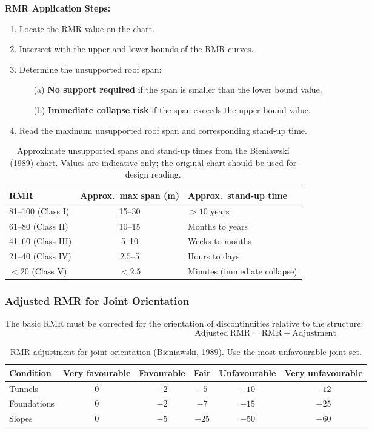\documentclass[a4paper,12pt]{article}
\begin{document}
\textbf{RMR Application Steps:}
\begin{enumerate}
    \item Locate the RMR value on the chart.
    \item Intersect with the upper and lower bounds of the RMR curves.
    \item Determine the unsupported roof span:
    \begin{itemize}
        \item[(a)] \textbf{No support required} if the span is smaller than the lower bound value.
        \item[(b)] \textbf{Immediate collapse risk} if the span exceeds the upper bound value.
    \end{itemize}
    \item Read the maximum unsupported roof span and corresponding stand-up time.
\end{enumerate}

\begin{table}[ht]
\centering
\begin{tabularx}{\textwidth}{l c X}
\toprule
\textbf{RMR} & \textbf{Approx.\ max span (m)} & \textbf{Approx.\ stand-up time} \\
\midrule
81--100 (Class I) & 15--30 & $>10$ years \\
61--80 (Class II) & 10--15 & Months to years \\
41--60 (Class III) & 5--10 & Weeks to months \\
21--40 (Class IV) & 2.5--5 & Hours to days \\
$<20$ (Class V) & $<2.5$ & Minutes (immediate collapse) \\
\bottomrule
\end{tabularx}
\caption{Approximate unsupported spans and stand-up times from the Bieniawski (1989) chart. Values are indicative only; the original chart should be used for design reading.}
\end{table}

\subsubsection{Adjusted RMR for Joint Orientation}
The basic RMR must be corrected for the orientation of discontinuities relative to the structure:
\[
\mathrm{Adjusted\ RMR} = \mathrm{RMR} + \mathrm{Adjustment}
\]

\begin{table}[ht]
\centering
\begin{tabular}{lccccc}
\toprule
\textbf{Condition} & \textbf{Very favourable} & \textbf{Favourable} & \textbf{Fair} & \textbf{Unfavourable} & \textbf{Very unfavourable} \\
\midrule
Tunnels & 0 & $-2$ & $-5$ & $-10$ & $-12$ \\
Foundations & 0 & $-2$ & $-7$ & $-15$ & $-25$ \\
Slopes & 0 & $-5$ & $-25$ & $-50$ & $-60$ \\
\bottomrule
\end{tabular}
\caption{RMR adjustment for joint orientation (Bieniawski, 1989). Use the most unfavourable joint set.}
\end{table}
\end{document}
